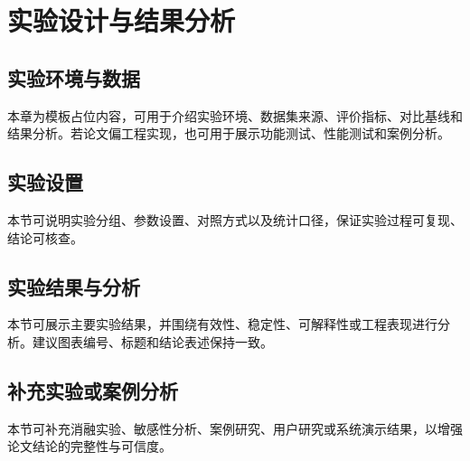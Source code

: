 \section{实验设计与结果分析}\label{chap:exp}

\subsection{实验环境与数据}

本章为模板占位内容，可用于介绍实验环境、数据集来源、评价指标、对比基线和结果分析。若论文偏工程实现，也可用于展示功能测试、性能测试和案例分析。

\subsection{实验设置}

本节可说明实验分组、参数设置、对照方式以及统计口径，保证实验过程可复现、结论可核查。

\subsection{实验结果与分析}

本节可展示主要实验结果，并围绕有效性、稳定性、可解释性或工程表现进行分析。建议图表编号、标题和结论表述保持一致。

\subsection{补充实验或案例分析}

本节可补充消融实验、敏感性分析、案例研究、用户研究或系统演示结果，以增强论文结论的完整性与可信度。
